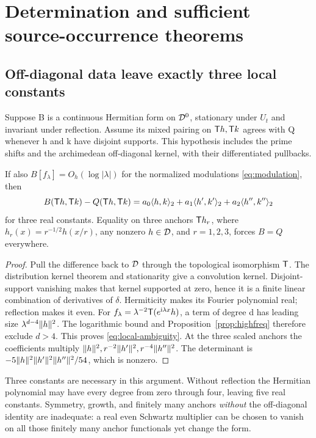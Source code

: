 \section{Determination and sufficient source-occurrence theorems}\label{sec:occurrence}
\subsection{Off-diagonal data leave exactly three local constants}
Suppose B is a continuous Hermitian form on $\mathcal D^0$,
stationary under $U_t$ and invariant under reflection.
Assume its mixed pairing on $\mathsf T h,\mathsf T k$ agrees with Q
whenever h and k have disjoint supports. This hypothesis
includes the prime shifts and the archimedean off-diagonal
kernel, with their differentiated pullbacks.

\begin{theorem}\label{thm:determination}
If also $B[f_\lambda]=O_h(\log|\lambda|)$ for the normalized
modulations \eqref{eq:modulation}, then
\begin{equation}\label{eq:local-ambiguity}
B(\mathsf T h,\mathsf T k)-Q(\mathsf T h,\mathsf T k)
=a_0\langle h,k\rangle_2+a_1\langle h',k'\rangle_2+a_2\langle h'',k''\rangle_2
\end{equation}
for three real constants. Equality on three anchors
$\mathsf T h_r$, where $h_r(x)=r^{-1/2}h(x/r)$, any nonzero
$h\in\mathcal D$, and $r=1,2,3$, forces $B=Q$ everywhere.
\end{theorem}
\begin{proof}
Pull the difference back to $\mathcal D$ through the topological
isomorphism $\mathsf T$. The distribution kernel theorem and
stationarity give a convolution kernel. Disjoint-support
vanishing makes that kernel supported at zero, hence it is
a finite linear combination of derivatives of $\delta$.
Hermiticity makes its Fourier polynomial real; reflection
makes it even. For
$f_\lambda=\lambda^{-2}\mathsf T(e^{\mathrm i\lambda x}h)$, a term of
degree d has leading size $\lambda^{d-4}\lVert h\rVert^2$.
The logarithmic bound and Proposition~\ref{prop:highfreq}
therefore exclude $d>4$. This proves
\eqref{eq:local-ambiguity}.
At the three scaled anchors the coefficients multiply
$\lVert h\rVert^2,r^{-2}\lVert h'\rVert^2,r^{-4}\lVert h''\rVert^2$.
The determinant is
$-5\lVert h\rVert^2\lVert h'\rVert^2\lVert h''\rVert^2/54$, which is nonzero.
\end{proof}
Three constants are necessary in this argument. Without
reflection the Hermitian polynomial may have every degree
from zero through four, leaving five real constants.
Symmetry, growth, and finitely many anchors \emph{without}
the off-diagonal identity are inadequate: a real even Schwartz
multiplier can be chosen to vanish on all those finitely
many anchor functionals yet change the form.

